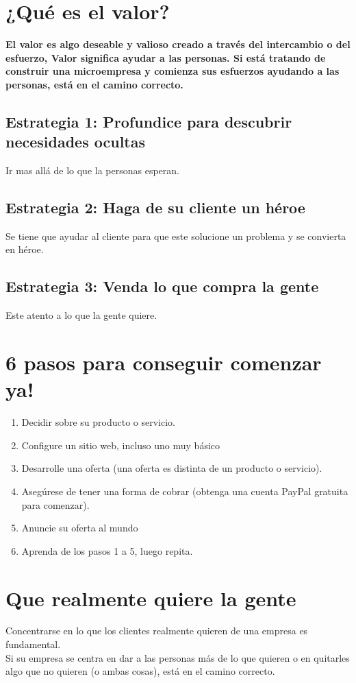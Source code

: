\documentclass[10pt]{book}
\begin{document}
	\section{¿Qué es el valor?}
	\textbf{El valor es algo deseable y valioso creado a través del intercambio o del esfuerzo, Valor significa ayudar a las personas. Si está tratando de construir una microempresa y comienza sus esfuerzos ayudando a las personas, está en el camino correcto. }\\

	    \subsection{Estrategia 1: Profundice para descubrir necesidades ocultas}
	    Ir mas allá de lo que la personas esperan.
	    \subsection{Estrategia 2: Haga de su cliente un héroe}
	    Se tiene que ayudar al cliente para que este solucione un problema y se convierta en héroe.
	    \subsection{Estrategia 3: Venda lo que compra la gente}
	    Este atento a lo que la gente quiere.

    \section{6 pasos para conseguir comenzar ya!}	
	\begin{enumerate}[\bfseries 1.]
	    \item Decidir sobre su producto o servicio. 
	    \item Configure un sitio web, incluso uno muy básico 
	    \item Desarrolle una oferta (una oferta es distinta de un producto o servicio).
	    \item Asegúrese de tener una forma de cobrar (obtenga una cuenta PayPal gratuita para comenzar). 
	    \item Anuncie su oferta al mundo 
	    \item Aprenda de los pasos 1 a 5, luego repita.
	\end{enumerate}

	\section{Que realmente quiere la gente}
	Concentrarse en lo que los clientes realmente quieren de una empresa es fundamental.\\
	Si su empresa se centra en dar a las personas más de lo que quieren o en quitarles algo que no quieren (o ambas cosas), está en el camino correcto.
\end{document}
